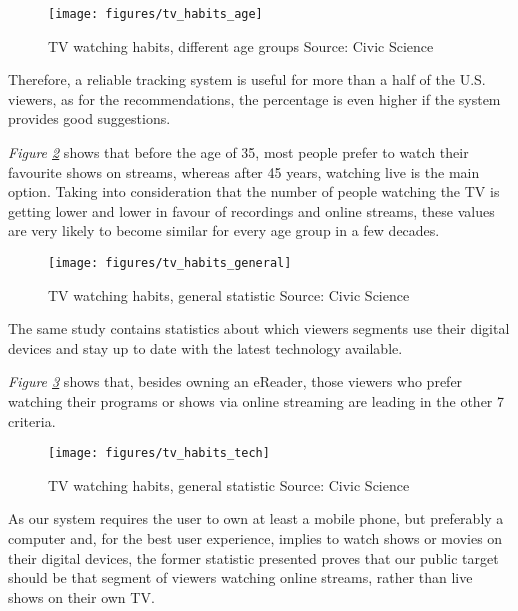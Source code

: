 \begin{figure}[h]
\centering
\texttt{[image: figures/tv\_habits\_age]}
\caption{TV watching habits, different age groups \newline Source: Civic Science}
\label{fig:tvhabitsage}
\end{figure}

Therefore, a reliable tracking system is useful for more than a half of the U.S. viewers, as for the recommendations, the percentage is even higher if the system provides good suggestions.

\textit{Figure \ref{fig:tvhabitsgeneral}} shows that before the age of 35, most people prefer to watch their favourite shows on streams, whereas after 45 years, watching live is the main option. Taking into consideration that the number of people watching the TV is getting lower and lower in favour of recordings and online streams, these values are very likely to become similar for every age group in a few decades.

\begin{figure}[h]
\centering
\texttt{[image: figures/tv\_habits\_general]}
\caption{TV watching habits, general statistic \newline Source: Civic Science}
\label{fig:tvhabitsgeneral}
\end{figure}

The same study contains statistics about which viewers segments use their digital devices and stay up to date with the latest technology available.

\textit{Figure \ref{fig:tvhabitstech}} shows that, besides owning an eReader, those viewers who prefer watching their programs or shows via online streaming are leading in the other 7 criteria.

\begin{figure}[h]
\centering
\texttt{[image: figures/tv\_habits\_tech]}
\caption{TV watching habits, general statistic \newline Source: Civic Science}
\label{fig:tvhabitstech}
\end{figure}

As our system requires the user to own at least a mobile phone, but preferably a computer and, for the best user experience, implies to watch shows or movies on their digital devices, the former statistic presented proves that our public target should be that segment of viewers watching online streams, rather than live shows on their own TV.